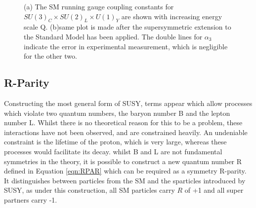\begin{figure}
\centering
{}
\caption{\label{fig:couple}(a) The SM running gauge coupling constants for $SU(3)_{C} \times SU(2)_{L} \times U(1)_{Y}$ are shown with increasing energy scale Q. (b)same plot is made after the supersymmetric extension to the Standard Model has been applied. The double lines for $\alpha_{3}$ indicate the error in experimental  measurement, which is negligible for the other two.~\cite{PeskinBSM}}
\end{figure}



\subsection{R-Parity}

Constructing the most general form of SUSY, terms appear which allow processes which violate two quantum numbers, the baryon number B and the lepton number L. Whilst there is no theoretical reason for this to be a problem, these interactions have not been observed, and are constrained heavily. An undeniable constraint is the lifetime of the proton, which is very large, whereas these processes would facilitate its decay. whilst B and L are not fundamental symmetries in the theory, it is possible to construct a new quantum number R defined in Equation \ref{eqn:RPAR} which can be required as a symmetry R-parity\cite{terning}. It distinguishes between particles from the SM and the sparticles introduced by SUSY, as under this construction, all SM particles carry $R$ of +1 and all super partners carry -1. 

